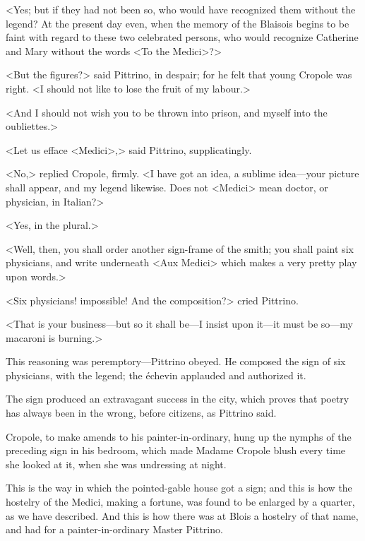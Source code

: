 <Yes; but if they had not been so, who would have recognized them without the legend? At the present day even, when the memory of the Blaisois begins to be faint with regard to these two celebrated persons, who would recognize Catherine and Mary without the words <To the Medici>?>

<But the figures?> said Pittrino, in despair; for he felt that young Cropole was right. <I should not like to lose the fruit of my labour.>

<And I should not wish you to be thrown into prison, and myself into the oubliettes.>

<Let us efface <Medici>,> said Pittrino, supplicatingly.

<No,> replied Cropole, firmly. <I have got an idea, a sublime idea—your picture shall appear, and my legend likewise. Does not <Medici> mean doctor, or physician, in Italian?>

<Yes, in the plural.>

<Well, then, you shall order another sign-frame of the smith; you shall paint six physicians, and write underneath <Aux Medici> which makes a very pretty play upon words.>

<Six physicians! impossible! And the composition?> cried Pittrino.

<That is your business—but so it shall be—I insist upon it—it must be so—my macaroni is burning.>

This reasoning was peremptory—Pittrino obeyed. He composed the sign of six physicians, with the legend; the échevin applauded and authorized it.

The sign produced an extravagant success in the city, which proves that poetry has always been in the wrong, before citizens, as Pittrino said.

Cropole, to make amends to his painter-in-ordinary, hung up the nymphs of the preceding sign in his bedroom, which made Madame Cropole blush every time she looked at it, when she was undressing at night.

This is the way in which the pointed-gable house got a sign; and this is how the hostelry of the Medici, making a fortune, was found to be enlarged by a quarter, as we have described. And this is how there was at Blois a hostelry of that name, and had for a painter-in-ordinary Master Pittrino. 